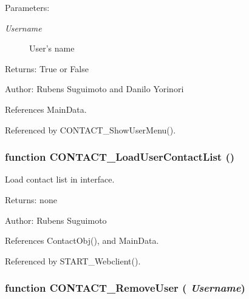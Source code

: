 \begin{Desc}
\item[Parameters:]
\begin{description}
\item[{\em Username}]User's name \end{description}
\end{Desc}
\begin{Desc}
\item[Returns:]True or False \end{Desc}
\begin{Desc}
\item[Author:]Rubens Suguimoto and Danilo Yorinori \end{Desc}


References MainData.

Referenced by CONTACT\_\-ShowUserMenu().
\subsubsection[CONTACT\_\-LoadUserContactList]{\setlength{\rightskip}{0pt plus 5cm}function CONTACT\_\-LoadUserContactList ()}\label{contact_2contact_8js_09fbaeeba27deedb01dc1180a27e46da}


Load contact list in interface. 

\begin{Desc}
\item[Returns:]none \end{Desc}
\begin{Desc}
\item[Author:]Rubens Suguimoto \end{Desc}


References ContactObj(), and MainData.

Referenced by START\_\-Webclient().
\subsubsection[CONTACT\_\-RemoveUser]{\setlength{\rightskip}{0pt plus 5cm}function CONTACT\_\-RemoveUser ( {\em Username})}\label{contact_2contact_8js_a6e9a955731970ad128a5a766060d73a}


